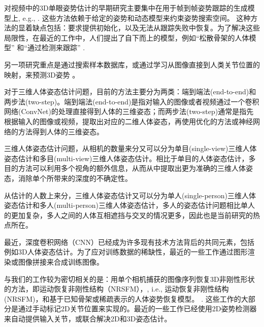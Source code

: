 \begin{refsection}
对视频中的3D单眼姿势估计的早期研究主要集中在用于帧到帧姿势跟踪的生成模型上, e.g.,  \cite{bregler1998tracking,sminchisescu2003kinematic}. 
这些方法依赖于给定的姿势和动态模型来约束姿势搜索空间。
这种方法的显着缺点包括：要求提供初始化，以及无法从跟踪失败中恢复。为了解决这些局限性，在最近的工作中，人们提出了自下而上的模型，例如``松散骨架的人体模型'' \cite{sigal2012loose} 和``通过检测来跟踪'' \cite{andriluka2010monocular}.

另一项研究重点是通过搜索样本数据库\cite{shakhnarovich2003fast,mori2006recovering,jiang20103d,yasin2016dual}，或通过学习从图像直接到人类关节位置的映射，来预测3D姿势 \cite{agarwal2006recovering,bo2010twin,salzmann2010implicitly,yu2013unconstrained,ionescu2014human,kostrikov2014depth}。

对于三维人体姿态估计问题，目前的方法主要分为两类：端到端法(end-to-end)\autocite{pavlakos2017coarse}和两步法(two-step)\autocite{zhou2016sparseness}。端到端法(end-to-end)\autocite{pavlakos2017coarse}是指对输入的图像或者视频通过一个卷积网络(ConvNet)的处理直接得到人体的三维姿态；而两步法(two-step)\autocite{zhou2016sparseness}通常是指先根据输入的图像或视频，提取出对应的二维人体姿态，再使用优化的方法或神经网络的方法得到人体的三维姿态。

三维人体姿态估计问题，从相机的数量来分又可以分为单目(single-view)三维人体姿态估计和多目(multi-view)三维人体姿态估计。相比于单目的人体姿态估计，多目的方法可以利用多个视角的额外信息，从而从中提取出更为准确的三维人体姿态，消除单个所带来的深度的不确定性。

从估计的人数上来分，三维人体姿态估计又可以分为单人(single-person)三维人体姿态估计和多人(multi-person)三维人体姿态估计，多人的姿态估计问题相比单人的更加复杂，多人之间的人体互相遮挡与交叉的情况更多，因此也是当前研究的热点所在。


最近，深度卷积网络（CNN）已经成为许多现有技术方法背后的共同元素，包括例如3D人体姿态估计\cite{li20143d,li2015maximum,tekin2015predicting,du2016marker,park20163d,zhou2016deep}。为了应对训练数据的稀缺性，最近的一些工作通过图形渲染\cite{chen2016synthesizing}或图像拼接\cite{rogez2016mocap}来合成训练图像。 

与我们的工作较为密切相关的是：用单个相机捕获的图像序列恢复3D非刚性形状的方法，即运动恢复非刚性结构（NRSFM），\cite{bregler2000recovering,akhter2011trajectory,dai2012simple,zhu2014complex,cho2015complex}, i.e., 运动恢复非刚性结构 (NRSFM)，和基于已知骨架\cite{lee1985determination,taylor2000reconstruction,valmadre2010deterministic,park20113d,radwan2013monocular,leonardos2016articulated}或稀疏表示的人体姿势恢复模型。 \cite{ramakrishna2012reconstructing,fan2014pose,akhter2015pose,zhou20153d,zhou2015sparse}. 这些工作的大部分是通过手动标记2D关节位置来实现的。最近的一些工作已经使用2D姿势检测器来自动提供输入关节\cite{simo2012single,wang2014robust}，或联合解决2D和3D姿态估计\cite{simo2013joint,zhou2014spatio}。


\end{refsection}
